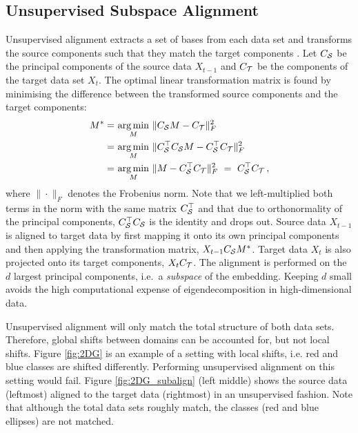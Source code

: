 \documentclass[letterpaper]{article} %
\begin{document}
\subsection{Unsupervised Subspace Alignment}
Unsupervised alignment extracts a set of bases from each data set and transforms the source components such that they match the target components \cite{fernando2013unsupervised}. Let $C_{\cal S}$ be the principal components of the source data $X_{t-1}$ and $C_{\cal T}$ be the components of the target data set $X_t$. The optimal linear transformation matrix is found by minimising the difference between the transformed source components and the target components:
\begin{align}
    M^{*} =& \ \underset{M}{\arg \min} \ \| C_{\cal S}M - C_{\cal T}\|^{2}_{F} \nonumber \\
    =& \ \underset{M}{\arg \min} \ \| C_{\cal S}^{\top} C_{\cal S}M - C_{\cal S}^{\top}C_{\cal T}\|^{2}_{F} \nonumber \\
    =& \ \underset{M}{\arg \min} \ \| M - C_{\cal S}^{\top}C_{\cal T}\|^{2}_{F} \ = \ C_{\cal S}^{\top} C_{\cal T} \label{eq:unsup_align} \, ,
\end{align}
where $\| \cdot \|_{F}$ denotes the Frobenius norm. Note that we left-multiplied both terms in the norm with the same matrix $C_{\cal S}^{\top}$ and that due to orthonormality of the principal components, $C_{\cal S}^{\top} C_{\cal S}$ is the identity and drops out. 
Source data $X_{t-1}$ is aligned to target data by first mapping it onto its own principal components and then applying the transformation matrix, $X_{t-1} C_{\cal S} M^{*}$. Target data $X_t$ is also projected onto its target components, $X_t C_{\cal T}$. 
The alignment is performed on the $d$ largest principal components, i.e.~a \emph{subspace} of the embedding. Keeping $d$ small avoids the high computational expense of eigendecomposition in high-dimensional data. 

Unsupervised alignment will only match the total structure of both data sets. Therefore, global shifts between domains can be accounted for, but not local shifts. Figure \ref{fig:2DG} is an example of a setting with local shifts, i.e. red and blue classes are shifted differently. Performing unsupervised alignment on this setting would fail. Figure  \ref{fig:2DG_subalign} (left middle) shows the source data (leftmost) aligned to the target data (rightmost) in an unsupervised fashion. Note that although the total data sets roughly match, the classes (red and blue ellipses) are not matched.
\end{document}
